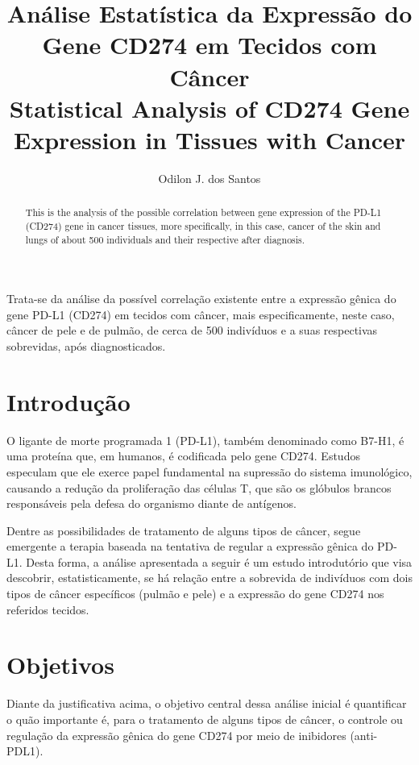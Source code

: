 \documentclass[a4paper,12pt]{article}
\title{Análise Estatística da Expressão do Gene CD274 em Tecidos com Câncer\\
Statistical Analysis of CD274 Gene Expression in Tissues with Cancer}
\author{Odilon J. dos Santos\inst{1}}
\begin{document}
 

\maketitle

\begin{abstract}
  This is the analysis of the possible correlation between gene expression
  of the PD-L1 (CD274) gene in cancer tissues, more specifically, in this case,
  cancer of the skin and lungs of about 500 individuals and their respective
  after diagnosis.
\end{abstract}
     
\begin{resumo} 
 Trata-se da análise da possível correlação existente entre a expressão gênica
 do gene PD-L1 (CD274) em tecidos com câncer, mais especificamente, neste caso,
 câncer de pele e de pulmão, de cerca de 500 indivíduos e a suas respectivas 
 sobrevidas, após diagnosticados. 
\end{resumo}


\section{Introdução} \label{sec:firstpage}

O ligante de morte programada 1 (PD-L1), também denominado como B7-H1, é uma
proteína que, em humanos, é codificada pelo gene CD274. Estudos especulam que 
ele exerce papel fundamental na supressão do sistema imunológico, causando a redução
da proliferação das células T, que são os glóbulos brancos responsáveis pela defesa
do organismo diante de antígenos.

Dentre as possibilidades de tratamento de alguns tipos de câncer, segue emergente
a terapia baseada na tentativa de regular a expressão gênica do PD-L1. Desta forma, 
a análise apresentada a seguir é um estudo introdutório que visa descobrir, estatisticamente,
 se há relação entre a sobrevida de indivíduos com dois tipos de câncer específicos 
 (pulmão e pele) e a expressão do gene CD274 nos referidos tecidos.

\section{Objetivos} \label{sec:firstpage}

Diante da justificativa acima, o objetivo central dessa análise inicial é quantificar o quão importante é, para
o tratamento de alguns tipos de câncer, o controle ou regulação da expressão gênica do gene CD274
por meio de inibidores (anti-PDL1).
\end{document}
